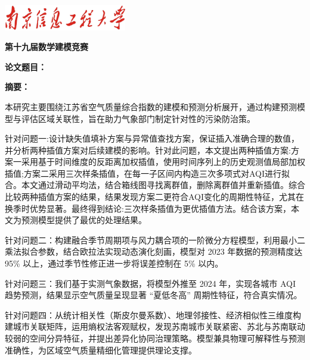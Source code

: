 \documentclass[a4paper,12pt]{article}
\begin{document}
	\newpage
	\setcounter{page}{1}
	
	\begin{center}
		\includegraphics[width=0.4\textwidth]{南京信息工程大学.png}
	\end{center}
	
	
	\begin{center}
		\textbf{ 第十九届数学建模竞赛}
	\end{center}
	
	\vspace{0.593cm}
	
	\begin{center}
		\heiti {}\textbf{论文题目：\underline{\hspace{10cm}}}
	\end{center}
	
	\begin{center}
		\lishu	{}\textbf{摘\quad 要：}\\
	\end{center}

	
	
	{\songti {}
		
		本研究主要围绕江苏省空气质量综合指数的建模和预测分析展开，通过构建预测模型与评估区域关联性，旨在助力气象部门制定针对性的污染防治策。
		
		针对问题一:设计缺失值填补方案与异常值查找方案，保证插入准确合理的数值，并分析两种插值方案对后续建模的影响。针对此问题，本文提出两种插值方案:方案一采用基于时间维度的反距离加权插值，使用时间序列上的历史观测值局部加权插值;方案二采用三次样条插值，在每一子区间内构造三次多项式对AQI进行拟合。本文通过滑动平均法，结合箱线图寻找离群值，删除离群值并重新插值。综合比较两种插值方案的结果，结果发现方案二更符合AQI变化的周期性特征，尤其在换季时优势显著。最终得到结论:三次样条插值为更优插值方法。结合该方案，本文为预测模型提供了最优的处理结果。
		
		针对问题二：构建融合季节周期项与风力耦合项的一阶微分方程模型，利用最小二乘法拟合参数，结合欧拉法实现动态演化刻画，模型对 2023 年数据的预测精度达 95\% 以上，通过季节性修正进一步将误差控制在 5\% 以内。
		
		针对问题三：我们基于实测气象数据，将模型外推至 2024 年，实现各城市 AQI 趋势预测，结果显示空气质量呈现显著 “夏低冬高” 周期性特征，符合真实情况。
		
		针对问题四：从统计相关性（斯皮尔曼系数）、地理邻接性、经济相似性三维度构建城市关联矩阵，运用熵权法客观赋权，发现苏南城市关联紧密、苏北与苏南联动较弱的空间分异特征，并提出差异化协同治理策略。模型兼具物理可解释性与预测准确性，为区域空气质量精细化管理提供理论支撑。
	}
	
\end{document}
